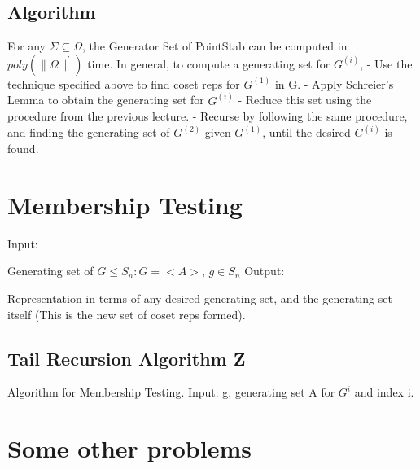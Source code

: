 \subsection{Algorithm}
For any $\Sigma\subseteq\Omega$, the Generator Set of PointStab can be computed in $poly(\|\Omega\|^{'} )$  time. In general, to compute a generating set for $G^{(i)}$,\newline
	- Use the technique specified above to find coset reps for $G^{(1)}$ in G.
	- Apply Schreier's Lemma to obtain the generating set for $G^{(i)}$ \newline
	- Reduce this set using the procedure from the previous lecture.\newline
	- Recurse by following the same procedure, and finding the generating set of $G^{(2)}$ given $G^{(1)}$, until the desired $G^{(i)}$ is found. \newline

\section{Membership Testing}
Input:

	Generating set of $G \leq S_n: G= <A>$,
	$g\in S_n$\newline
Output:

	Representation in terms of any desired generating set, and the generating set itself (This is the new set of coset reps formed).

\subsection{Tail Recursion Algorithm Z}
\begin{algorithm}
\caption{Algorithm for Membership Testing. Input: g, generating set A for $G^i$ and index i.}
\begin{algorithmic}[1]
\EndIf
{}
\EndIf
{}
\end{algorithmic}
\end{algorithm}



\section{Some other problems}
